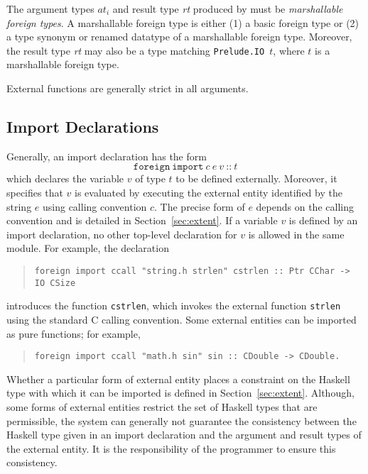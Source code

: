 \documentclass[a4paper,twosides]{article}
\newcommand{\code}[1]{\texttt{#1}}      %
\begin{document}
The argument types \(\textit{at}_i\) and result type \textit{rt} produced by
 must be \emph{marshallable foreign types}.  A marshallable
foreign type is either (1) a basic foreign type or (2) a type synonym or
renamed datatype of a marshallable foreign type.  Moreover, the result type
\textit{rt} may also be a type matching \code{Prelude.IO }$t$, where $t$ is
a marshallable foreign type.

External functions are generally strict in all arguments.

\subsection{Import Declarations}
\label{sec:import}

Generally, an import declaration has the form
%
\[
\code{foreign}~\code{import}~c~e~v~\code{{::}}~t
\]
%
which declares the variable $v$ of type $t$ to be defined externally.
Moreover, it specifies that $v$ is evaluated by executing the external entity
identified by the string $e$ using calling convention $c$.  The precise form
of $e$ depends on the calling convention and is detailed in
Section~\ref{sec:extent}.  If a variable $v$ is defined by an import
declaration, no other top-level declaration for $v$ is allowed in the same
module.  For example, the declaration
%
\begin{quote}
\begin{verbatim}
foreign import ccall "string.h strlen" cstrlen :: Ptr CChar -> IO CSize
\end{verbatim}
\end{quote}
%
introduces the function \code{cstrlen}, which invokes the external function
\code{strlen} using the standard C calling convention.  Some external entities
can be imported as pure functions; for example,
%
\begin{quote}
\begin{verbatim}
foreign import ccall "math.h sin" sin :: CDouble -> CDouble.
\end{verbatim}
\end{quote}
%
Whether a particular form of external entity places a constraint on the
Haskell type with which it can be imported is defined in
Section~\ref{sec:extent}.  Although, some forms of external entities restrict
the set of Haskell types that are permissible, the system can generally not
guarantee the consistency between the Haskell type given in an import
declaration and the argument and result types of the external entity.  It is
the responsibility of the programmer to ensure this consistency.
\end{document}
